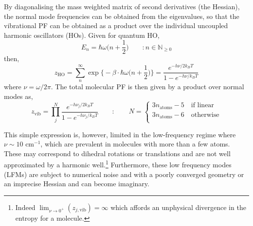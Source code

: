 \documentclass[../main.tex]{subfiles}
\begin{document}
By diagonalising the mass weighted matrix of second derivatives (the Hessian), the normal mode frequencies can be obtained from the eigenvalues, so that the vibrational PF can be obtained as a product over the individual uncoupled harmonic oscillators (HOs). Given for quantum HO,
\begin{equation}
E_n = \hbar\omega {\Big (} n + \frac{1}{2} {\Big )} \qquad : n \in \mathbb{N}_{\ge 0}
\end{equation}
then,
\begin{equation}
	z_\text{HO} = \sum_{n}^\infty \exp {\Big \{} -{\beta}\cdot  \hbar\omega {\Big (} n + \frac{1}{2} {\Big )} {\Big \}}  = \frac{e^{-h\nu / 2 k_B T}}{1 - e^{-h\nu / k_B T} }
\end{equation}
where $\nu = \omega / 2\pi$. The total molecular PF is then given by a product over normal modes as,
\begin{equation}
z_\text{vib} = \prod_j^{N} \frac{e^{-h\nu_j / 2 k_B T}}{1 - e^{-h\nu_j / k_B T} } \qquad : \qquad  N = \begin{cases}
	3 n_\text{atoms} - 5 \quad\text{if linear} \\
	3 n_\text{atoms} - 6 \quad\text{otherwise} \\
 \end{cases}
\label{z_ho}
\end{equation}

This simple expression is, however, limited in the low-frequency regime where $\nu \sim 10 \text{ cm}^{-1}$, which are prevalent in molecules with more than a few atoms. These may correspond to dihedral rotations or translations and are not well approximated by a harmonic well.\footnote{Indeed $\lim_{\nu \rightarrow 0^+} (z_{j, \text{vib}})= \infty$ which affords an unphysical divergence in the entropy for a molecule.} Furthermore, these low frequency modes (LFMs) are subject to numerical noise and with a poorly converged geometry or an imprecise Hessian and can become imaginary.
\end{document}
